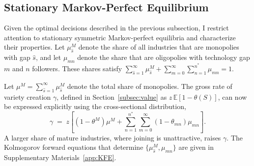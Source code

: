 \documentclass[12pt]{article}
\begin{document}
\subsection{Stationary Markov-Perfect Equilibrium}\label{sec:stationary}

Given the optimal decisions described in the previous subsection, I restrict attention to stationary symmetric Markov-perfect equilibria and characterize their properties. Let \(\mu^M_{\hat{s}}\) denote the share of all industries that are monopolies with gap \(\hat{s}\), and let \(\mu_{mn}\) denote the share that are oligopolies with technology gap \(m\) and \(n\) followers. These shares satisfy \(\sum_{\hat{s}=1}^\infty \mu^M_{\hat{s}} + \sum_{m=0}^\infty \sum_{n=1}^{n^\ast} \mu_{mn} = 1\).

Let \(\mu^M = \sum_{\hat{s}=1}^{\infty} \mu^M_{\hat{s}}\) denote the total share of monopolies. The gross rate of variety creation \(\gamma\), defined in Section~\ref{subsec:value} as \(z\,\mathbb{E}[1-\theta(S)]\), can now be expressed explicitly using the cross-sectional distribution,
\[
\gamma \;=\; z\left[(1-\theta^M)\mu^M + \sum_{n=1}^{n^\ast}\sum_{m=0}^\infty (1-\theta_{mn})\mu_{mn}\right].
\]
A larger share of mature industries, where joining is unattractive, raises \(\gamma\). The Kolmogorov forward equations that determine \(\{\mu^M_{\hat{s}}, \mu_{mn}\}\) are given in Supplementary Materials~\ref{app:KFE}.
\end{document}
